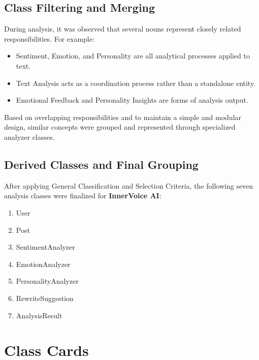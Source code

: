 \documentclass[12pt,a4paper]{report}
\begin{document}
\subsection{Class Filtering and Merging}

During analysis, it was observed that several nouns represent closely related responsibilities. For example:

\begin{itemize}
    \item Sentiment, Emotion, and Personality are all analytical processes applied to text.
    \item Text Analysis acts as a coordination process rather than a standalone entity.
    \item Emotional Feedback and Personality Insights are forms of analysis output.
\end{itemize}

Based on overlapping responsibilities and to maintain a simple and modular design, similar concepts were grouped and represented through specialized analyzer classes.

\subsection{Derived Classes and Final Grouping}

After applying General Classification and Selection Criteria, the following seven analysis classes were finalized for \textbf{InnerVoice AI}:

\begin{enumerate}
    \item User
    \item Post
    \item SentimentAnalyzer
    \item EmotionAnalyzer
    \item PersonalityAnalyzer
    \item RewriteSuggestion
    \item AnalysisResult
\end{enumerate}

\section{Class Cards}
\end{document}
